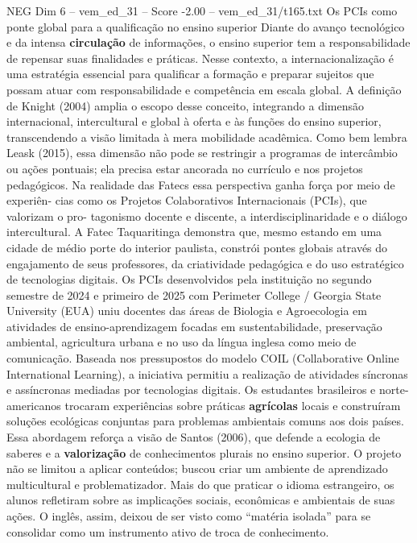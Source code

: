 \begin{textsample}{NEG Dim 6 – vem\_ed\_31 – Score -2.00 – vem\_ed\_31/t165.txt}  \label{ex:f6_neg_108}
Os PCIs como ponte global para a qualificação no ensino superior Diante do avanço tecnológico e da intensa \textbf{circulação} de informações, o ensino superior tem a responsabilidade de repensar suas finalidades e práticas.
Nesse contexto, a internacionalização é uma estratégia essencial para qualificar a formação e preparar sujeitos que possam atuar com responsabilidade e competência em escala global.
A definição de Knight (2004) amplia o escopo desse conceito, integrando a dimensão internacional, intercultural e global à oferta e às funções do ensino superior, transcendendo a visão limitada à mera mobilidade acadêmica.
Como bem lembra Leask (2015), essa dimensão não pode se restringir a programas de intercâmbio ou ações pontuais; ela precisa estar ancorada no currículo e nos projetos pedagógicos.
Na realidade das Fatecs essa perspectiva ganha força por meio de experiên- cias como os Projetos Colaborativos Internacionais (PCIs), que valorizam o pro- tagonismo docente e discente, a interdisciplinaridade e o diálogo intercultural.
A Fatec Taquaritinga demonstra que, mesmo estando em uma cidade de médio porte do interior paulista, constrói pontes globais através do engajamento de seus professores, da criatividade pedagógica e do uso estratégico de tecnologias digitais.
Os PCIs desenvolvidos pela instituição no segundo semestre de 2024 e primeiro de 2025 com Perimeter College / Georgia State University (EUA) uniu docentes das áreas de Biologia e Agroecologia em atividades de ensino-aprendizagem focadas em sustentabilidade, preservação ambiental, agricultura urbana e no uso da língua inglesa como meio de comunicação.
Baseada nos pressupostos do modelo COIL (Collaborative Online International Learning), a iniciativa permitiu a realização de atividades síncronas e assíncronas mediadas por tecnologias digitais.
Os estudantes brasileiros e norte-americanos trocaram experiências sobre práticas \textbf{agrícolas} locais e construíram soluções ecológicas conjuntas para problemas ambientais comuns aos dois países.
Essa abordagem reforça a visão de Santos (2006), que defende a ecologia de saberes e a \textbf{valorização} de conhecimentos plurais no ensino superior.
O projeto não se limitou a aplicar conteúdos; buscou criar um ambiente de aprendizado multicultural e problematizador.
Mais do que praticar o idioma estrangeiro, os alunos refletiram sobre as implicações sociais, econômicas e ambientais de suas ações.
O inglês, assim, deixou de ser visto como “matéria isolada” para se consolidar como um instrumento ativo de troca de conhecimento.

\end{textsample}
